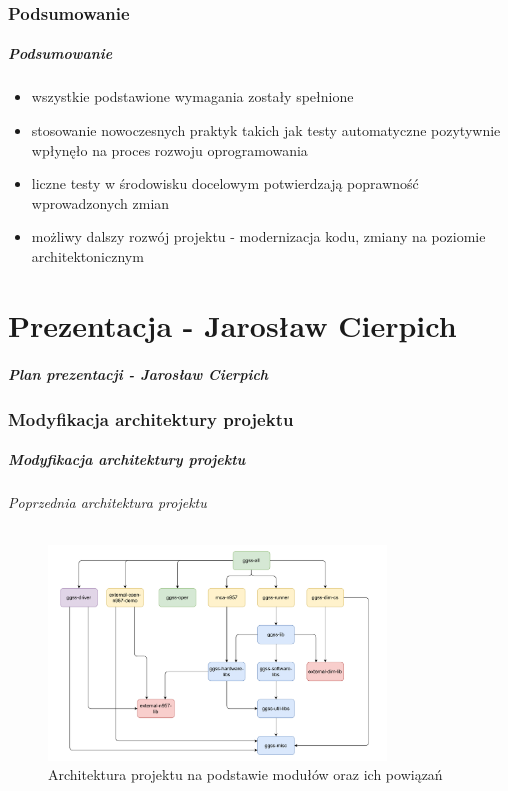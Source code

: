 \documentclass[10pt]{beamer}
\begin{document}
\section{Podsumowanie}

\begin{frame}
\frametitle{Podsumowanie}
\begin{itemize}
    \item wszystkie podstawione wymagania zostały spełnione
    \item stosowanie nowoczesnych praktyk takich jak testy automatyczne pozytywnie wpłynęło na proces rozwoju oprogramowania
    \item liczne testy w środowisku docelowym potwierdzają poprawność wprowadzonych zmian
    \item możliwy dalszy rozwój projektu - modernizacja kodu, zmiany na poziomie architektonicznym
\end{itemize}
\end{frame}


\part{Prezentacja - Jarosław Cierpich}

\begin{frame}
\frametitle{Plan prezentacji - Jarosław Cierpich}
\tableofcontents
\end{frame}

\section{Modyfikacja architektury projektu}

\begin{frame}
\frametitle{Modyfikacja architektury projektu}
\framesubtitle{Poprzednia architektura projektu}
\begin{figure}
    \includegraphics[width=0.8\textwidth]{static/old_structure.pdf}
    \caption{Architektura projektu na podstawie modułów oraz ich powiązań}
\end{figure}
\end{frame}
\end{document}
